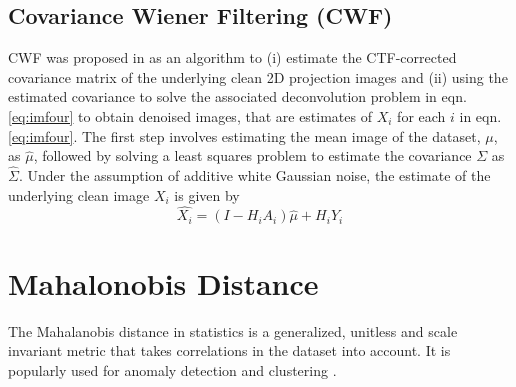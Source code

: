 \documentclass{article}
\begin{document}
\subsection{Covariance Wiener Filtering (CWF)}
CWF was proposed in \cite{cwf} as an algorithm to (i) estimate the CTF-corrected covariance matrix of the underlying clean 2D projection images and (ii) using the estimated covariance to solve the associated deconvolution problem in eqn. \ref{eq:imfour} to obtain denoised images, that are estimates of $X_i$ for each $i$ in 
eqn. \ref{eq:imfour}. The first step involves estimating the mean image of the dataset, $\mu$, as $\hat{\mu}$, followed by solving a least squares problem to estimate the covariance $\Sigma$ as $\hat{\Sigma}$. Under the assumption of additive white Gaussian noise, the estimate of the underlying clean image $X_i$ is given by
\begin{equation}
\hat{X_i}=(I-H_iA_i)\hat{\mu} + H_iY_i
\end{equation}
%
\section{Mahalonobis Distance}
The Mahalanobis distance in statistics \cite{mah} is a generalized, unitless and scale invariant metric that takes correlations in the dataset into account. It is popularly used for anomaly detection and clustering \cite{mahclust1, mahclust2}.
 
\end{document}
